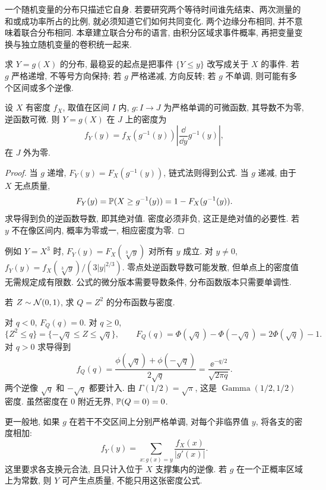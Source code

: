 \label{chap:joint}

一个随机变量的分布只描述它自身. 若要研究两个等待时间谁先结束、两次测量的和或成功率所占的比例, 就必须知道它们如何共同变化. 两个边缘分布相同, 并不意味着联合分布相同. 本章建立联合分布的语言, 由积分区域求事件概率, 再把变量变换与独立随机变量的卷积统一起来.


求 $Y=g(X)$ 的分布, 最稳妥的起点是把事件 $\{Y\le y\}$ 改写成关于 $X$ 的事件. 若 $g$ 严格递增, 不等号方向保持; 若 $g$ 严格递减, 方向反转; 若 $g$ 不单调, 则可能有多个区间或多个逆像.

\begin{proposition}[单调变换]
设 $X$ 有密度 $f_X$, 取值在区间 $I$ 内, $g:I\to J$ 为严格单调的可微函数, 其导数不为零, 逆函数可微. 则 $Y=g(X)$ 在 $J$ 上的密度为
\[
 f_Y(y)=f_X(g^{-1}(y))\left|\frac{\dd}{\dd y}g^{-1}(y)\right|,
\]
在 $J$ 外为零.
\end{proposition}
\begin{proof}
当 $g$ 递增, $F_Y(y)=F_X(g^{-1}(y))$, 链式法则得到公式. 当 $g$ 递减, 由于 $X$ 无点质量,
\[
 F_Y(y)=\mathbb P(X\ge g^{-1}(y))=1-F_X(g^{-1}(y)).
\]
求导得到负的逆函数导数, 即其绝对值. 密度必须非负, 这正是绝对值的必要性. 若 $y$ 不在像区间内, 概率为零或一, 相应密度为零.
\end{proof}

例如 $Y=X^3$ 时, $F_Y(y)=F_X(\sqrt[3]y)$ 对所有 $y$ 成立. 对 $y\ne0$, $f_Y(y)=f_X(\sqrt[3]y)/(3|y|^{2/3})$. 零点处逆函数导数可能发散, 但单点上的密度值无需规定成有限数. 公式的微分版本需要导数条件, 分布函数版本只需要单调性.

\begin{example}
若 $Z\sim\mathcal N(0,1)$, 求 $Q=Z^2$ 的分布函数与密度.
\end{example}
\begin{solution}
对 $q<0$, $F_Q(q)=0$. 对 $q\ge0$,
\[
 \{Z^2\le q\}=\{-\sqrt q\le Z\le\sqrt q\},\qquad
 F_Q(q)=\Phi(\sqrt q)-\Phi(-\sqrt q)=2\Phi(\sqrt q)-1.
\]
对 $q>0$ 求导得到
\[
 f_Q(q)=\frac{\phi(\sqrt q)+\phi(-\sqrt q)}{2\sqrt q}
       =\frac{\ee^{-q/2}}{\sqrt{2\pi q}}.
\]
两个逆像 $\sqrt q$ 和 $-\sqrt q$ 都要计入. 由 $\Gamma(1/2)=\sqrt\pi$, 这是 $\operatorname{Gamma}(1/2,1/2)$ 密度. 虽然密度在 $0$ 附近无界, $\mathbb P(Q=0)=0$.
\end{solution}

更一般地, 如果 $g$ 在若干不交区间上分别严格单调, 对每个非临界值 $y$, 将各支的密度相加:
\[
 f_Y(y)=\sum_{x:g(x)=y}\frac{f_X(x)}{|g'(x)|}.
\]
这里要求各支换元合法, 且只计入位于 $X$ 支撑集内的逆像. 若 $g$ 在一个正概率区域上为常数, 则 $Y$ 可产生点质量, 不能只用这张密度公式.

